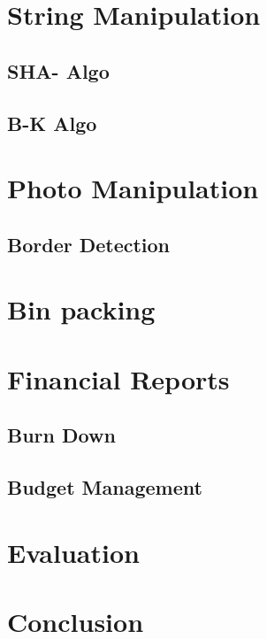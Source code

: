 \documentclass[a4paper]{article}
\begin{document}
\section{String Manipulation}

\subsection{SHA- Algo}

\subsection{B-K Algo}

\section{Photo Manipulation}

\subsection{Border Detection}

\section{Bin packing}

\section{Financial Reports}

\subsection{Burn Down}

\subsection{Budget Management}

\section{Evaluation}

\section{Conclusion}



\newpage{}



\end{document}
